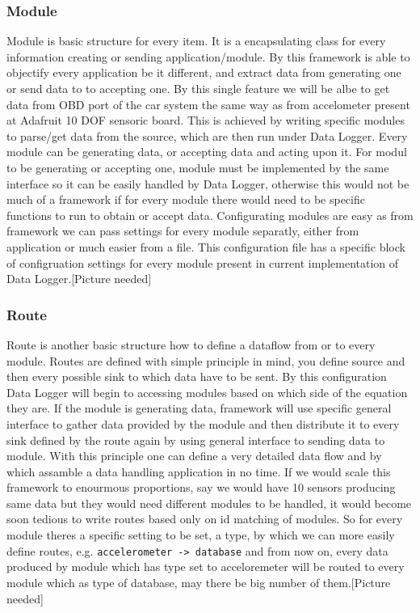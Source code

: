 \subsubsection{Module}
\label{ssub:module}
Module is basic structure for every item. It is a encapsulating class for every information creating or sending application/module. By this framework is able to objectify every application be it different, and extract data from generating one or send data to to accepting one. By this single feature we will be albe to get data from OBD port of the car system the same way as from accelometer present at Adafruit 10 DOF sensoric board. This is achieved by writing specific modules to parse/get data from the source, which are then run under Data Logger. Every module can be generating data, or accepting data and acting upon it. For modul to be generating or accepting one, module must be implemented by the same interface so it can be easily handled by Data Logger, otherwise this would not be much of a framework if for every module there would need to be specific functions to run to obtain or accept data. Configurating modules are easy as from framework we can pass settings for every module separatly, either from application or much easier from a file. This configuration file has a specific block of configruation settings for every module present in current implementation of Data Logger.[Picture needed]
\subsubsection{Route} %
\label{ssub:route}
Route is another basic structure how to define a dataflow from or to every module. Routes are defined with simple principle in mind, you define source and then every possible sink to which data have to be sent. By this configuration Data Logger will begin to accessing modules based on which side of the equation they are. If the module is generating data, framework will use specific general interface to gather data provided by the module and then distribute it to every sink defined by the route again by using general interface to sending data to module. With this principle one can define a very detailed data flow and by which assamble a data handling application in no time. If we would scale this framework to enourmous proportions, say we would have 10 sensors producing same data but they would need different modules to be handled, it would become soon tedious to write routes based only on id matching of modules. So for every module theres a specific setting to be set, a type, by which we can more easily define routes, e.g. \verb|accelerometer -> database| and from now on, every data produced by module which has type set to acceloremeter will be routed to every module which as type of database, may there be big number of them.[Picture needed]
\label{sub:data_logger_framework}
